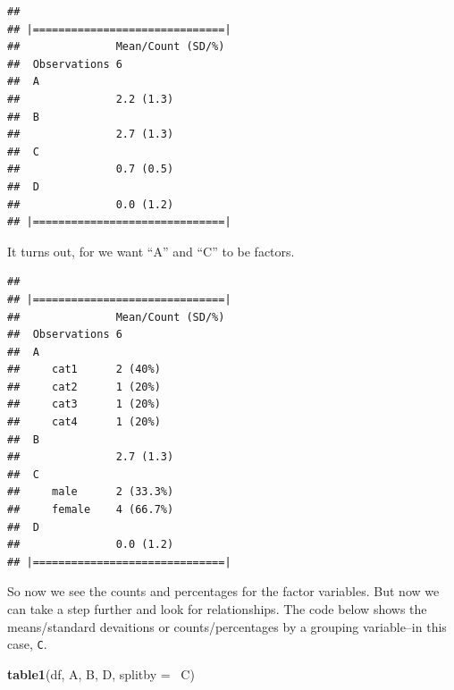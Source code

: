 \documentclass[]{tufte-book}
\newenvironment{Shaded}{}{}
\newcommand{\KeywordTok}[1]{\textcolor[rgb]{0.00,0.44,0.13}{\textbf{#1}}}
\newcommand{\DataTypeTok}[1]{\textcolor[rgb]{0.56,0.13,0.00}{#1}}
\newcommand{\StringTok}[1]{\textcolor[rgb]{0.25,0.44,0.63}{#1}}
\newcommand{\OperatorTok}[1]{\textcolor[rgb]{0.40,0.40,0.40}{#1}}
\newcommand{\NormalTok}[1]{#1}
\theoremstyle{definition}
\theoremstyle{definition}
\theoremstyle{remark}
\begin{document}
\begin{verbatim}
## 
## |==============================|
##               Mean/Count (SD/%)
##  Observations 6                
##  A                             
##               2.2 (1.3)        
##  B                             
##               2.7 (1.3)        
##  C                             
##               0.7 (0.5)        
##  D                             
##               0.0 (1.2)        
## |==============================|
\end{verbatim}

It turns out, for we want ``A'' and ``C'' to be factors.

\begin{Shaded}
\end{Shaded}

\begin{verbatim}
## 
## |==============================|
##               Mean/Count (SD/%)
##  Observations 6                
##  A                             
##     cat1      2 (40%)          
##     cat2      1 (20%)          
##     cat3      1 (20%)          
##     cat4      1 (20%)          
##  B                             
##               2.7 (1.3)        
##  C                             
##     male      2 (33.3%)        
##     female    4 (66.7%)        
##  D                             
##               0.0 (1.2)        
## |==============================|
\end{verbatim}

So now we see the counts and percentages for the factor variables. But
now we can take a step further and look for relationships. The code
below shows the means/standard devaitions or counts/percentages by a
grouping variable--in this case, \texttt{C}.

\begin{Shaded}
\begin{Highlighting}[]
\KeywordTok{table1}\NormalTok{(df, A, B, D, }\DataTypeTok{splitby =} \OperatorTok{~}\NormalTok{C)}
\end{Highlighting}
\end{Shaded}
\end{document}

